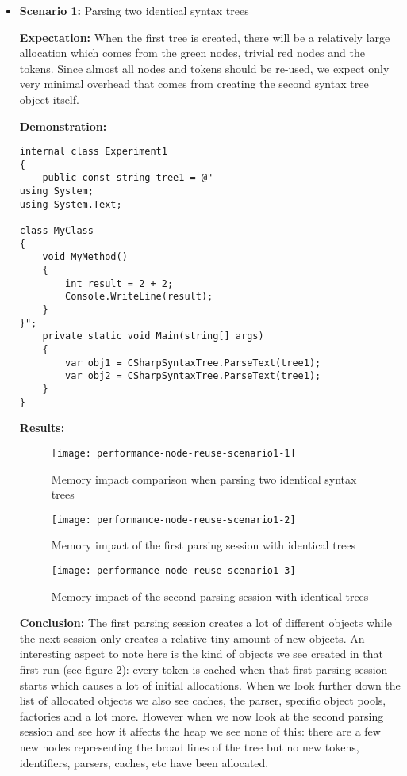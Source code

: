 \begin{itemize}
\item \textbf{Scenario 1:} Parsing two identical syntax trees

\textbf{Expectation:} When the first tree is created, there will be a relatively large allocation which comes from the green nodes, trivial red nodes and the tokens. Since almost all nodes and tokens should be re-used, we expect only very minimal overhead that comes from creating the second syntax tree object itself.

\textbf{Demonstration:} 

\begin{lstlisting}
internal class Experiment1
{
	public const string tree1 = @"
using System;
using System.Text;

class MyClass 
{
    void MyMethod()
    {
        int result = 2 + 2;
        Console.WriteLine(result);
    }
}";
	private static void Main(string[] args)
	{
		var obj1 = CSharpSyntaxTree.ParseText(tree1);
		var obj2 = CSharpSyntaxTree.ParseText(tree1);
	}
}
\end{lstlisting}

\textbf{Results:}

\begin{figure}[H]
\centering
\texttt{[image: performance-node-reuse-scenario1-1]}
\caption{Memory impact comparison when parsing two identical syntax trees}
\label{img:performance-node-reuse-scenario1-1}
\end{figure}

\begin{figure}[H]
\centering
\texttt{[image: performance-node-reuse-scenario1-2]}
\caption{Memory impact of the first parsing session with identical trees}
\label{img:performance-node-reuse-scenario1-2}
\end{figure}

\begin{figure}[H]
\centering
\texttt{[image: performance-node-reuse-scenario1-3]}
\caption{Memory impact of the second parsing session with identical trees}
\label{img:performance-node-reuse-scenario1-3}
\end{figure}

\textbf{Conclusion:} The first parsing session creates a lot of different objects while the next session only creates a relative tiny amount of new objects. An interesting aspect to note here is the kind of objects we see created in that first run (see figure \ref{img:performance-node-reuse-scenario1-2}): every token is cached when that first parsing session starts which causes a lot of initial allocations. 
When we look further down the list of allocated objects we also see caches, the parser, specific object pools, factories and a lot more. However when we now look at the second parsing session and see how it affects the heap we see none of this: there are a few new nodes representing the broad lines of the tree but no new tokens, identifiers, parsers, caches, etc have been allocated.



\end{itemize}
